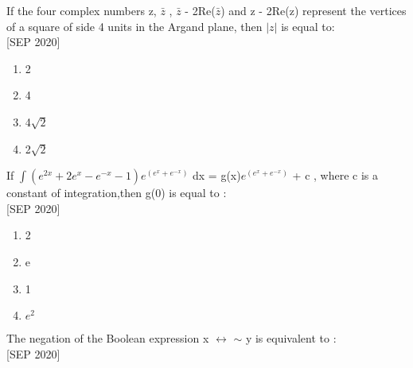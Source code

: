 \iffalse
  \title{Assignment}
  \author{ee24btech11030}
  \section{mcq-single}
\fi

\item If the four complex numbers z, $\bar{z}$ , $\bar{z}$ - 2Re($\bar{z}$)  and z - 2Re(z) represent the vertices of a square of side 4 units in the Argand plane, then $|z|$ is equal to: \\ \hfill{[SEP 2020]}
    \begin{multicols}{4}
    \begin{enumerate}
        \item 2
        \item 4
        \item 4$\sqrt{2}$
        \item 2$\sqrt{2}$
    \end{enumerate}
    \end{multicols}
    \item If $\int(e^{2x} + 2e^{x} - e^{-x} - 1)e^{(e^x + e^{-x})}$ dx = g(x)$e^{(e^x + e^{-x})}$ + c , where c is a constant of integration,then g(0) is equal to : \\ \hfill{[SEP 2020]}
    \begin{multicols}{4}
    \begin{enumerate}
        \item 2
        \item e
        \item 1
        \item $e^2$
    \end{enumerate} 
    \end{multicols}
    \item The negation of the Boolean expression x $\leftrightarrow$ $\sim$ y  is equivalent to : \\ \hfill{[SEP 2020]}

